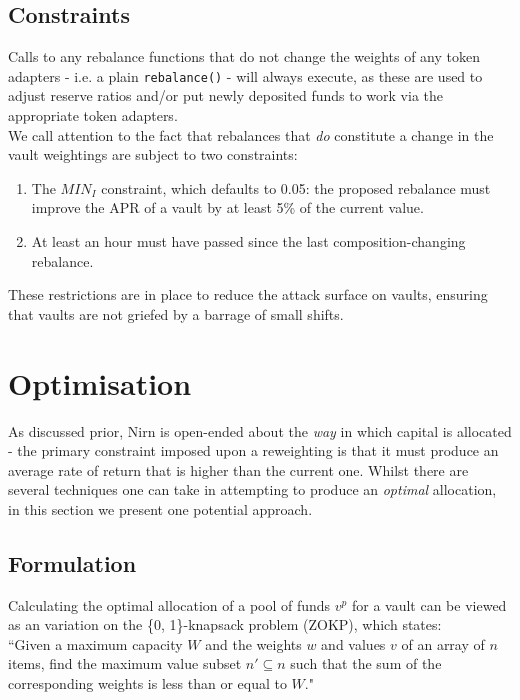 \documentclass{article}
\begin{document}
\subsection{Constraints}

Calls to any rebalance functions that do not change the weights of any token adapters - i.e. a plain \texttt{rebalance()} - will always execute, as these are used to adjust reserve ratios and/or put newly deposited funds to work via the appropriate token adapters.\\

\noindent
We call attention to the fact that rebalances that \textit{do} constitute a change in the vault weightings are subject to two constraints:

\begin{enumerate}
    \item The \textit{$MIN_I$} constraint, which defaults to 0.05: the proposed rebalance must improve the APR of a vault by at least 5\% of the current value.
    \item At least an hour must have passed since the last composition-changing rebalance.
\end{enumerate}

\noindent
These restrictions are in place to reduce the attack surface on vaults, ensuring that vaults are not griefed by a barrage of small shifts. 

\newpage
\section{Optimisation}

As discussed prior, Nirn is open-ended about the \textit{way} in which capital is allocated - the primary constraint imposed upon a reweighting is that it must produce an average rate of return that is higher than the current one. Whilst there are several techniques one can take in attempting to produce an \textit{optimal} allocation, in this section we present one potential approach.

\subsection{Formulation}

Calculating the optimal allocation of a pool of funds $v^p$ for a vault can be viewed as an variation on the \{0, 1\}-knapsack problem (ZOKP), which states:\\

\noindent
``Given a maximum capacity $W$ and the weights $w$ and values $v$ of an array of $n$ items, find the maximum value subset $n' \subseteq n$ such that the sum of the corresponding weights is less than or equal to $W$."
\end{document}
